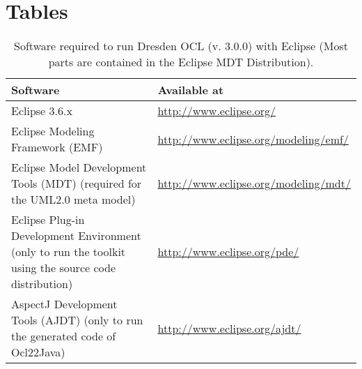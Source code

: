 \cleardoublepage
{}
{}
\chapter*{Tables}

\begin{table}[h]
\begin{tabular}{|p{7cm}|p{7cm}|}
    \hline
    \textbf{Software} & \textbf{Available at} \\
    \hline
    Eclipse 3.6.x & \url{http://www.eclipse.org/} \\
    \hline
    Eclipse Modeling Framework (EMF) & \url{http://www.eclipse.org/modeling/emf/} \\
    \hline
    Eclipse Model Development Tools (MDT) 
    \newline\footnotesize(required for the UML2.0 meta model) &
    \url{http://www.eclipse.org/modeling/mdt/} \\
    \hline
    Eclipse Plug-in Development Environment 
    \newline\footnotesize(only to run the toolkit using the source code
    distribution) & \url{http://www.eclipse.org/pde/} \\
    \hline
    AspectJ Development Tools (AJDT) 
    \newline\footnotesize(only to run the generated code of Ocl22Java) &
    \url{http://www.eclipse.org/ajdt/} \\
    \hline
\end{tabular}
\caption{Software required to run Dresden OCL (v. 3.0.0) with Eclipse \newline(Most parts are con\-tained in the Eclipse MDT Distribution).}
\label{tab:software}
\end{table}


